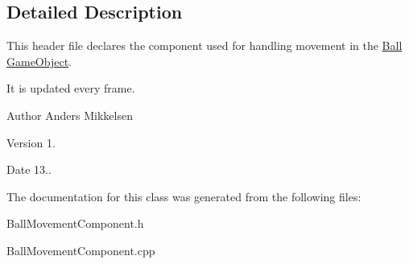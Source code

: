 \subsection{Detailed Description}
This header file declares the component used for handling movement in the \hyperlink{class_ball}{Ball} \hyperlink{class_game_object}{Game\+Object}. 

It is updated every frame.

\begin{DoxyAuthor}{Author}
Anders Mikkelsen 
\end{DoxyAuthor}
\begin{DoxyVersion}{Version}
1. 
\end{DoxyVersion}
\begin{DoxyDate}{Date}
13.. 
\end{DoxyDate}


The documentation for this class was generated from the following files\+:\begin{DoxyCompactItemize}
\item 
Ball\+Movement\+Component.\+h\item 
Ball\+Movement\+Component.\+cpp\end{DoxyCompactItemize}
